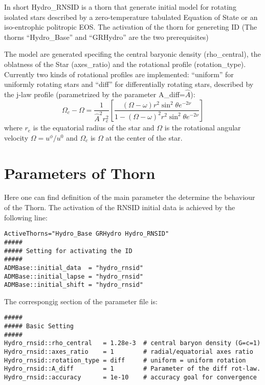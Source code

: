 In short Hydro\_RNSID is a thorn that generate initial model for rotating 
isolated stars described by a zero-temperature tabulated Equation of State or
an iso-entrophic politropic EOS. The activation of the thorn for
genereting ID (The thorns ``Hydro\_Base'' and  ``GRHydro'' are the two prerequisites)

The model are generated specifing the central baryonic density
(rho\_central), the oblatness of the Star (axes\_ratio) and the
rotational profile (rotation\_type).  Currently two kinds of
rotational profiles are implemented: ``uniform'' for uniformly
rotating stars and ``diff'' for differentially rotating stars,
described by the j-law profile (parametrized by the parameter
A\_diff=$\hat{A}$):
\begin{equation}
  \Omega_c-\Omega = \frac{1}{\hat{A}^2 r_e^2}
  \left[ \frac{(\Omega-\omega) r^2 \sin^2 \theta e^{-2\nu}}{1-(\Omega-\omega)^2 r^2 \sin^2 \theta e^{-2\nu}}\right]
\end{equation}
where $r_e$ is the equatorial radius of the star and $\Omega$ is the
rotational angular velocity $\Omega=u^\phi/u^0$ and $\Omega_c$ is
$\Omega$ at the center of the star.


\section{Parameters of Thorn}
\label{sec:rnsid_par}

Here one can find definition of the main parameter the determine the
behaviour of the Thorn. The activation of the RNSID initial data
is achieved by the following line:
\begin{verbatim}
ActiveThorns="Hydro_Base GRHydro Hydro_RNSID"
#####
##### Setting for activating the ID 
#####
ADMBase::initial_data  = "hydro_rnsid"
ADMBase::initial_lapse = "hydro_rnsid"
ADMBase::initial_shift = "hydro_rnsid"
\end{verbatim}

The correspongig section of the parameter file is:
\begin{verbatim}
#####
##### Basic Setting
#####
Hydro_rnsid::rho_central   = 1.28e-3  # central baryon density (G=c=1) 
Hydro_rnsid::axes_ratio    = 1        # radial/equatorial axes ratio 
Hydro_rnsid::rotation_type = diff     # uniform = uniform rotation
Hydro_rnsid::A_diff        = 1        # Parameter of the diff rot-law.
Hydro_rnsid::accuracy      = 1e-10    # accuracy goal for convergence
\end{verbatim}



